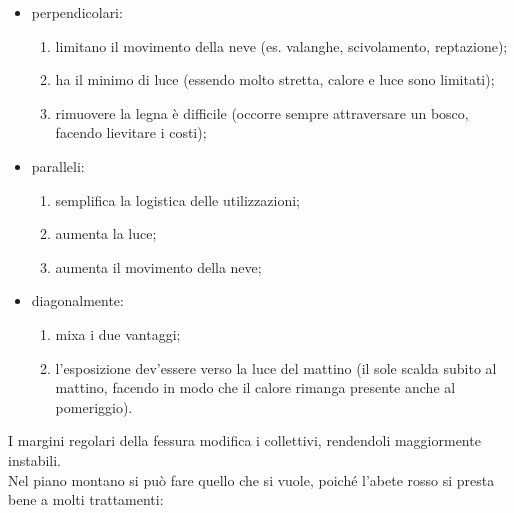 \begin{itemize}[nosep]
    \item perpendicolari: 
    \begin{enumerate}[nosep]
        \item limitano il movimento della neve (es. valanghe, scivolamento, reptazione); 
        \item ha il minimo di luce (essendo molto stretta, calore e luce sono limitati);
        \item rimuovere la legna è difficile (occorre sempre attraversare un bosco, facendo lievitare i costi);
    \end{enumerate}
    \item paralleli: 
    \begin{enumerate}[nosep]
        \item semplifica la logistica delle utilizzazioni;
        \item aumenta la luce;
        \item aumenta il movimento della neve;
    \end{enumerate}
       \item diagonalmente:
       \begin{enumerate}[nosep]
        \item  mixa i due vantaggi;
        \item l'esposizione dev'essere verso la luce del mattino (il sole scalda subito al mattino, facendo in modo che il calore rimanga presente anche al pomeriggio).
       \end{enumerate}
\end{itemize}
I margini regolari della fessura modifica i collettivi, rendendoli maggiormente instabili.\\
Nel piano montano si può fare quello che si vuole, poiché l'abete rosso si presta bene a molti trattamenti:

